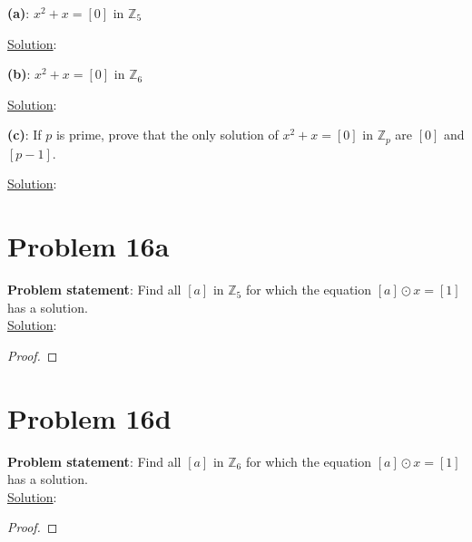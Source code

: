 \documentclass{article} %
\begin{document}
\textbf{(a)}: $x^2 + x = [0]$ in $\mathbb{Z}_5$
\\
\begin{addmargin}[1em]{0em}
\underline{Solution}: 
\begin{addmargin}[1em]{0em}
\end{addmargin}
\end{addmargin}

\textbf{(b)}: $x^2 + x = [0]$ in $\mathbb{Z}_6$
\\
\begin{addmargin}[1em]{0em}
\underline{Solution}: 
\begin{addmargin}[1em]{0em}
\end{addmargin}
\end{addmargin}

\textbf{(c)}: If $p$ is prime, prove that the only solution of $x^2 + x = [0]$ in $\mathbb{Z}_p$ are $[0]$ and $[p-1]$.
\\
\begin{addmargin}[1em]{0em}
\underline{Solution}: 
\begin{addmargin}[1em]{0em}
\end{addmargin}
\end{addmargin}

\newpage

\section*{Problem 16a}


\textbf{Problem statement}: Find all $[a]$ in $\mathbb{Z}_5$ for which the equation $[a] \odot x = [1]$ has a solution.
\\

\underline{Solution}: 
\begin{addmargin}[1em]{0em}
\begin{proof}

\end{proof}
\end{addmargin}

\newpage

\section*{Problem 16d}


\textbf{Problem statement}: Find all $[a]$ in $\mathbb{Z}_6$ for which the equation $[a] \odot x = [1]$ has a solution.
\\

\underline{Solution}: 
\begin{addmargin}[1em]{0em}
\begin{proof}

\end{proof}
\end{addmargin}

\end{document}
